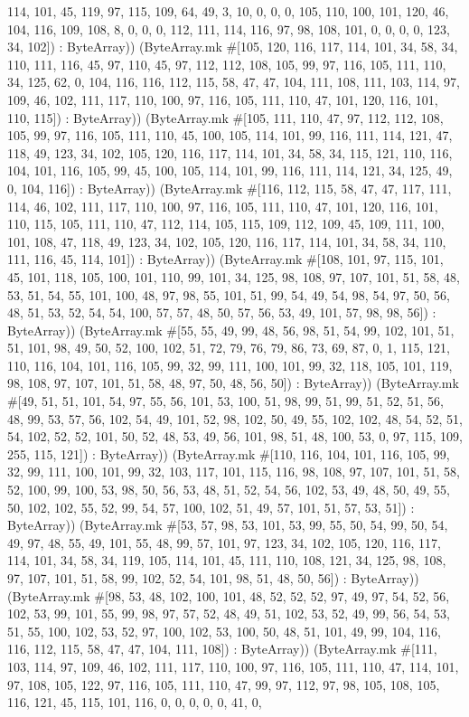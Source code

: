 \documentclass[11pt]{article}
\begin{document}
114, 101, 45, 119, 97, 115, 109, 64, 49, 3, 10, 0, 0, 0, 105, 110, 100, 101, 120, 46, 104, 116, 109, 108, 8, 0, 0, 0, 112, 111, 114, 116, 97, 98, 108, 101, 0, 0, 0, 0, 123, 34, 102]) : ByteArray)) (ByteArray.mk \#[105, 120, 116, 117, 114, 101, 34, 58, 34, 110, 111, 116, 45, 97, 110, 45, 97, 112, 112, 108, 105, 99, 97, 116, 105, 111, 110, 34, 125, 62, 0, 104, 116, 116, 112, 115, 58, 47, 47, 104, 111, 108, 111, 103, 114, 97, 109, 46, 102, 111, 117, 110, 100, 97, 116, 105, 111, 110, 47, 101, 120, 116, 101, 110, 115]) : ByteArray)) (ByteArray.mk \#[105, 111, 110, 47, 97, 112, 112, 108, 105, 99, 97, 116, 105, 111, 110, 45, 100, 105, 114, 101, 99, 116, 111, 114, 121, 47, 118, 49, 123, 34, 102, 105, 120, 116, 117, 114, 101, 34, 58, 34, 115, 121, 110, 116, 104, 101, 116, 105, 99, 45, 100, 105, 114, 101, 99, 116, 111, 114, 121, 34, 125, 49, 0, 104, 116]) : ByteArray)) (ByteArray.mk \#[116, 112, 115, 58, 47, 47, 117, 111, 114, 46, 102, 111, 117, 110, 100, 97, 116, 105, 111, 110, 47, 101, 120, 116, 101, 110, 115, 105, 111, 110, 47, 112, 114, 105, 115, 109, 112, 109, 45, 109, 111, 100, 101, 108, 47, 118, 49, 123, 34, 102, 105, 120, 116, 117, 114, 101, 34, 58, 34, 110, 111, 116, 45, 114, 101]) : ByteArray)) (ByteArray.mk \#[108, 101, 97, 115, 101, 45, 101, 118, 105, 100, 101, 110, 99, 101, 34, 125, 98, 108, 97, 107, 101, 51, 58, 48, 53, 51, 54, 55, 101, 100, 48, 97, 98, 55, 101, 51, 99, 54, 49, 54, 98, 54, 97, 50, 56, 48, 51, 53, 52, 54, 54, 100, 57, 57, 48, 50, 57, 56, 53, 49, 101, 57, 98, 98, 56]) : ByteArray)) (ByteArray.mk \#[55, 55, 49, 99, 48, 56, 98, 51, 54, 99, 102, 101, 51, 51, 101, 98, 49, 50, 52, 100, 102, 51, 72, 79, 76, 79, 86, 73, 69, 87, 0, 1, 115, 121, 110, 116, 104, 101, 116, 105, 99, 32, 99, 111, 100, 101, 99, 32, 118, 105, 101, 119, 98, 108, 97, 107, 101, 51, 58, 48, 97, 50, 48, 56, 50]) : ByteArray)) (ByteArray.mk \#[49, 51, 51, 101, 54, 97, 55, 56, 101, 53, 100, 51, 98, 99, 51, 99, 51, 52, 51, 56, 48, 99, 53, 57, 56, 102, 54, 49, 101, 52, 98, 102, 50, 49, 55, 102, 102, 48, 54, 52, 51, 54, 102, 52, 52, 101, 50, 52, 48, 53, 49, 56, 101, 98, 51, 48, 100, 53, 0, 97, 115, 109, 255, 115, 121]) : ByteArray)) (ByteArray.mk \#[110, 116, 104, 101, 116, 105, 99, 32, 99, 111, 100, 101, 99, 32, 103, 117, 101, 115, 116, 98, 108, 97, 107, 101, 51, 58, 52, 100, 99, 100, 53, 98, 50, 56, 53, 48, 51, 52, 54, 56, 102, 53, 49, 48, 50, 49, 55, 50, 102, 102, 55, 52, 99, 54, 57, 100, 102, 51, 49, 57, 101, 51, 57, 53, 51]) : ByteArray)) (ByteArray.mk \#[53, 57, 98, 53, 101, 53, 99, 55, 50, 54, 99, 50, 54, 49, 97, 48, 55, 49, 101, 55, 48, 99, 57, 101, 97, 123, 34, 102, 105, 120, 116, 117, 114, 101, 34, 58, 34, 119, 105, 114, 101, 45, 111, 110, 108, 121, 34, 125, 98, 108, 97, 107, 101, 51, 58, 99, 102, 52, 54, 101, 98, 51, 48, 50, 56]) : ByteArray)) (ByteArray.mk \#[98, 53, 48, 102, 100, 101, 48, 52, 52, 52, 97, 49, 97, 54, 52, 56, 102, 53, 99, 101, 55, 99, 98, 97, 57, 52, 48, 49, 51, 102, 53, 52, 49, 99, 56, 54, 53, 51, 55, 100, 102, 53, 52, 97, 100, 102, 53, 100, 50, 48, 51, 101, 49, 99, 104, 116, 116, 112, 115, 58, 47, 47, 104, 111, 108]) : ByteArray)) (ByteArray.mk \#[111, 103, 114, 97, 109, 46, 102, 111, 117, 110, 100, 97, 116, 105, 111, 110, 47, 114, 101, 97, 108, 105, 122, 97, 116, 105, 111, 110, 47, 99, 97, 112, 97, 98, 105, 108, 105, 116, 121, 45, 115, 101, 116, 0, 0, 0, 0, 0, 41, 0, 
\end{document}
